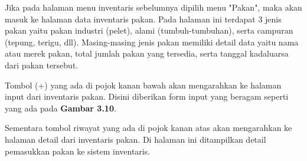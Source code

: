 \begin{enumerate}
\begin{enumerate}
		Jika pada halaman menu inventaris sebelumnya dipilih menu "Pakan", maka akan masuk ke halaman data inventaris pakan. Pada halaman ini terdapat 3 jenis pakan yaitu pakan industri (pelet), alami (tumbuh-tumbuhan), serta campuran (tepung, terigu, dll). Masing-masing jenis pakan memiliki detail data yaitu nama atau merek pakan, total jumlah pakan yang tersedia, serta tanggal kadaluarsa dari pakan tersebut.

		Tombol (+) yang ada di pojok kanan bawah akan mengarahkan ke halaman input dari inventaris pakan. Disini diberikan form input yang beragam seperti yang ada pada \textbf{Gambar 3.10}.

		Sementara tombol riwayat yang ada di pojok kanan atas akan mengarahkan ke halaman detail dari inventaris pakan. Di halaman ini ditampilkan detail pemasukkan pakan ke sistem inventaris.


\end{enumerate}
\end{enumerate}
